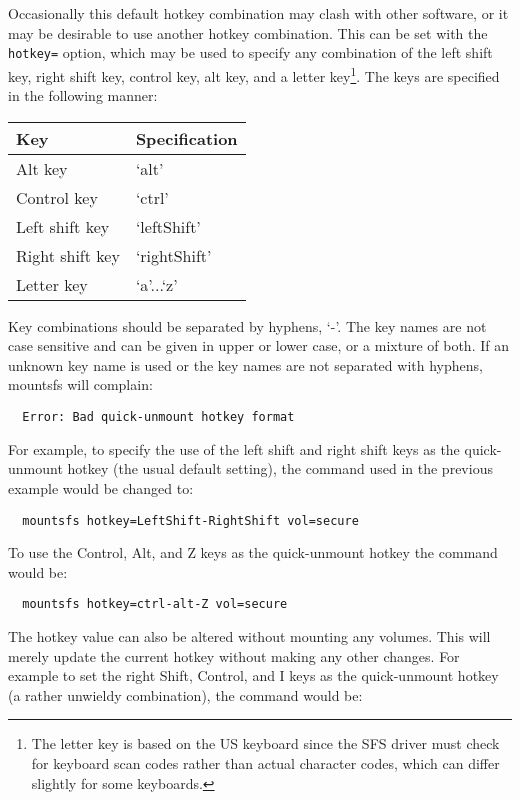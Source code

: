 Occasionally this default hotkey combination may clash with other software, or
it may be desirable to use another hotkey combination.  This can be set with
the {\tt hotkey=} option, which may be used to specify any combination of the left
shift key, right shift key, control key, alt key, and a letter key\footnote{
              The letter key is based on the US keyboard since the SFS driver
              must check for keyboard scan codes rather than actual character
              codes, which can differ slightly for some keyboards.
}.  The
keys are specified in the following manner:

\begin{center}
\begin{tabular}{|l|l|}
\hline
    Key            & Specification\\
\hline
    Alt key        & `alt'\\
    Control key    & `ctrl'\\
    Left shift key & `leftShift'\\
    Right shift key& `rightShift'\\
    Letter key     & `a'...`z'\\
\hline
\end{tabular}
\end{center}

Key combinations should be separated by hyphens, `-'.  The key names are not
case sensitive and can be given in upper or lower case, or a mixture of both.
If an unknown key name is used or the key names are not separated with hyphens,
mountsfs will complain:

{\tt \verb|  |Error: Bad quick-unmount hotkey format}

For example, to specify the use of the left shift and right shift keys as the
quick-unmount hotkey (the usual default setting), the command used in the
previous example would be changed to:

{\tt \verb|  |mountsfs hotkey=LeftShift-RightShift vol=secure}

To use the Control, Alt, and Z keys as the quick-unmount hotkey the command
would be:

{\tt \verb|  |mountsfs hotkey=ctrl-alt-Z vol=secure}

The hotkey value can also be altered without mounting any volumes.  This will
merely update the current hotkey without making any other changes.  For example
to set the right Shift, Control, and I keys as the quick-unmount hotkey (a
rather unwieldy combination), the command would be:

